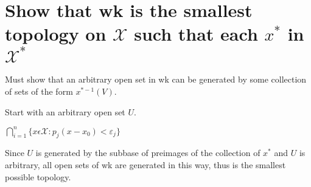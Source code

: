 \documentclass{article}
\begin{document}
\section{Show that wk is the smallest topology on $\mathscr{X}$ such that each $x^*$ in $\mathscr{X}^*$}

Must show that an arbitrary open set in wk can be generated by some collection of sets of the form $x^{*-1}(V)$.

Start with an arbitrary open set $U$.

$\bigcap^n_{i=1}\{x\epsilon \mathscr{X} : p_j( x-x_0) < \varepsilon_j\}$

Since $U$ is generated by the subbase of preimages of the collection of $x^*$ and $U$ is arbitrary, all open sets of wk are generated in this way, thus is the smallest possible topology.
\end{document}
